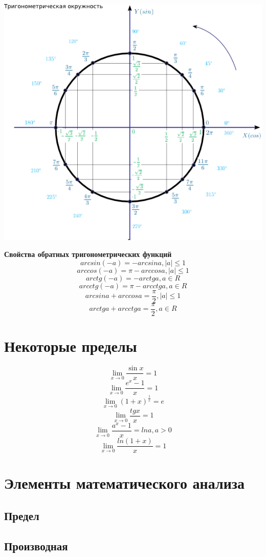 \documentclass[a4paper, 14pt]{extarticle}
\begin{document}
{\begin{center}
\includegraphics[width=0.9\linewidth]{trig_circle2.png}
\end{center}

\textbf{Свойства обратных тригонометрических функций}
$$arcsin(-a)=-arcsin a, |a|\le 1$$
$$arccos(-a)=\pi-arccos a, |a|\le 1$$
$$arctg(-a)=-arctg a, a\in R$$
$$arcctg(-a)=\pi-arcctg a, a\in R$$
$$arcsin a+ arccos a=\frac{\pi}{2}, |a|\le 1$$
$$arctg a+ arcctg a=\frac{\pi}{2}, a\in R$$

\section{Некоторые пределы}
$$\lim\limits_{x\to 0}\frac{\sin x}{x}=1$$
$$\lim\limits_{x\to 0}\frac{e^x-1}{x}=1$$
$$\lim\limits_{x\to 0}(1+x)^{\frac{1}{x}}=e$$
$$\lim\limits_{x\to 0}\frac{tg x}{x}=1$$
$$\lim\limits_{x\to 0}\frac{a^x-1}{x}=ln a, a>0$$
$$\lim\limits_{x\to 0}\frac{ln(1+x)}{x}=1$$

\section{Элементы математического анализа}

\subsection{Предел}

\subsection{Производная}

}
\end{document}
